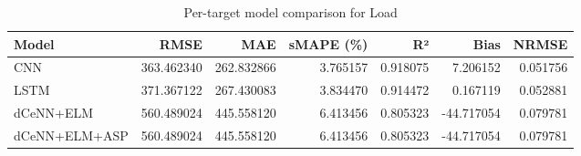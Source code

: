 \begin{table}
\caption{Per-target model comparison for Load}
\begin{tabular}{lrrrrrr}
\toprule
Model & RMSE & MAE & sMAPE (\%) & R² & Bias & NRMSE \\
\midrule
CNN & 363.462340 & 262.832866 & 3.765157 & 0.918075 & 7.206152 & 0.051756 \\
LSTM & 371.367122 & 267.430083 & 3.834470 & 0.914472 & 0.167119 & 0.052881 \\
dCeNN+ELM & 560.489024 & 445.558120 & 6.413456 & 0.805323 & -44.717054 & 0.079781 \\
dCeNN+ELM+ASP & 560.489024 & 445.558120 & 6.413456 & 0.805323 & -44.717054 & 0.079781 \\
\bottomrule
\end{tabular}
\end{table}
